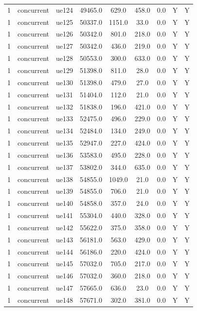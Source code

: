 \begin{table}[ht]
\begin{tabular}{|c|c|c|c|c|c|c|c|c|}
1 & concurrent & ue124 & 49465.0 & 629.0 & 458.0 & 0.0 & Y & Y \\
1 & concurrent & ue125 & 50337.0 & 1151.0 & 33.0 & 0.0 & Y & Y \\
1 & concurrent & ue126 & 50342.0 & 801.0 & 218.0 & 0.0 & Y & Y \\
1 & concurrent & ue127 & 50342.0 & 436.0 & 219.0 & 0.0 & Y & Y \\
1 & concurrent & ue128 & 50553.0 & 300.0 & 633.0 & 0.0 & Y & Y \\
1 & concurrent & ue129 & 51398.0 & 811.0 & 28.0 & 0.0 & Y & Y \\
1 & concurrent & ue130 & 51398.0 & 479.0 & 27.0 & 0.0 & Y & Y \\
1 & concurrent & ue131 & 51404.0 & 112.0 & 21.0 & 0.0 & Y & Y \\
1 & concurrent & ue132 & 51838.0 & 196.0 & 421.0 & 0.0 & Y & Y \\
1 & concurrent & ue133 & 52475.0 & 496.0 & 229.0 & 0.0 & Y & Y \\
1 & concurrent & ue134 & 52484.0 & 134.0 & 249.0 & 0.0 & Y & Y \\
1 & concurrent & ue135 & 52947.0 & 227.0 & 424.0 & 0.0 & Y & Y \\
1 & concurrent & ue136 & 53583.0 & 495.0 & 228.0 & 0.0 & Y & Y \\
1 & concurrent & ue137 & 53802.0 & 344.0 & 635.0 & 0.0 & Y & Y \\
1 & concurrent & ue138 & 54855.0 & 1049.0 & 21.0 & 0.0 & Y & Y \\
1 & concurrent & ue139 & 54855.0 & 706.0 & 21.0 & 0.0 & Y & Y \\
1 & concurrent & ue140 & 54858.0 & 357.0 & 24.0 & 0.0 & Y & Y \\
1 & concurrent & ue141 & 55304.0 & 440.0 & 328.0 & 0.0 & Y & Y \\
1 & concurrent & ue142 & 55622.0 & 375.0 & 358.0 & 0.0 & Y & Y \\
1 & concurrent & ue143 & 56181.0 & 563.0 & 429.0 & 0.0 & Y & Y \\
1 & concurrent & ue144 & 56186.0 & 220.0 & 424.0 & 0.0 & Y & Y \\
1 & concurrent & ue145 & 57032.0 & 705.0 & 217.0 & 0.0 & Y & Y \\
1 & concurrent & ue146 & 57032.0 & 360.0 & 218.0 & 0.0 & Y & Y \\
1 & concurrent & ue147 & 57665.0 & 636.0 & 23.0 & 0.0 & Y & Y \\
1 & concurrent & ue148 & 57671.0 & 302.0 & 381.0 & 0.0 & Y & Y \\

\end{tabular}
\end{table}
